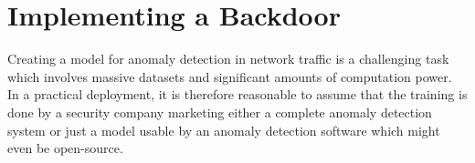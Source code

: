 \documentclass[sigconf,nonacm]{acmart}
\begin{document}
\begin{table}
\begin{tabular}{l r r}

\bottomrule
\end{tabular}
\end{table}



\section{Implementing a Backdoor}
Creating a model for anomaly detection in network traffic is a challenging task which involves massive datasets and significant amounts of computation power. In a practical deployment, it is therefore reasonable to assume that the training is done by a security company marketing either a complete anomaly detection system or just a model usable by an anomaly detection software which might even be open-source.
\end{document}
